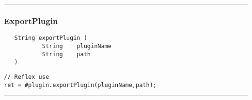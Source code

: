 \rule{15cm}{2pt}
\subsubsection{ExportPlugin}
\label{Api:ExportPlugin}
\begin{verbatim}
   String exportPlugin (
           String    pluginName
           String    path
   )
\end{verbatim}
\begin{lstlisting}[language=reflex]
// Reflex use
ret = #plugin.exportPlugin(pluginName,path);
\end{lstlisting}



\rule{15cm}{2pt}
